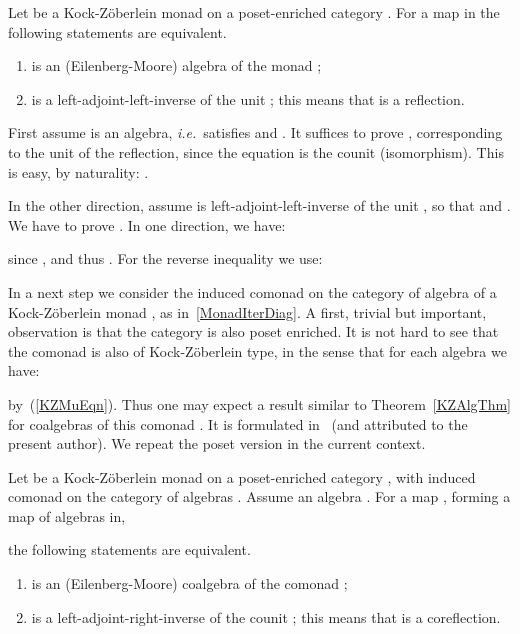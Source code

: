 \documentclass{LMCS}
\newenvironment{myproof}[1][Proof]{ \begin{trivlist}\item[\hskip \labelsep {\bfseries #1}]}{ \end{trivlist}}
\begin{document}
\begin{thm}
\label{KZAlgThm}
Let  be a Kock-Z{\"o}berlein monad on a poset-enriched category
. For a map  in  the
following statements are equivalent.
\begin{enumerate}[\em(1)]
\item  is an (Eilenberg-Moore) algebra
of the monad ;

\item  is a left-adjoint-left-inverse of the
  unit ; this means that  is a reflection.
\end{enumerate}
\end{thm}




\begin{myproof}
First assume  is an algebra,
\textit{i.e.}~satisfies  and . It suffices to prove ,
corresponding to the unit of the reflection, since the equation
 is the counit (isomorphism). This is easy, by
naturality: .

In the other direction, assume  is
left-adjoint-left-inverse of the unit ,
so that  and . We
have to prove . In one direction, we
have:


\noindent since , and
thus . For the reverse inequality we
use:

\end{myproof}



In a next step we consider the induced comonad  on the
category  of algebra of a Kock-Z{\"o}berlein monad , as
in~\eqref{MonadIterDiag}. A first, trivial but important, observation
is that the category  is also poset enriched. It is not hard
to see that the comonad  is also of Kock-Z{\"o}berlein
type, in the sense that for each algebra
 we have:


\noindent by~(\ref{KZMuEqn}). Thus one may expect a result similar to
Theorem~\ref{KZAlgThm} for coalgebras of this comonad
. It is formulated in~\cite[Thm.~4.2]{Kock95} (and
attributed to the present author). We repeat the poset version in the
current context.



\begin{thm}
\label{KZCoAlgThm}
Let  be a Kock-Z{\"o}berlein monad on a poset-enriched category
, with induced comonad  on the category of
algebras . Assume an algebra . For
a map , forming a map of algebras in,


\noindent the following statements are equivalent.
\begin{enumerate}[\em(1)]
\item  is an
  (Eilenberg-Moore) coalgebra of the comonad ;

\item  is a
  left-adjoint-right-inverse of the counit ; this means that  is a coreflection.
\end{enumerate}
\end{thm}
\end{document}
